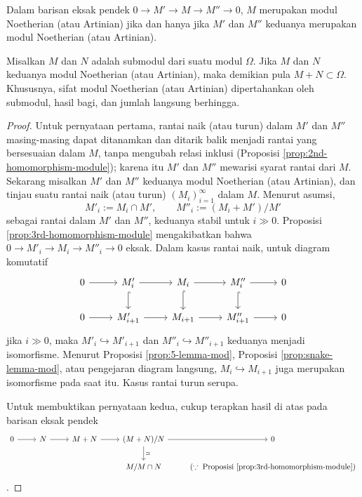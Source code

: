 \begin{lemma}\label{prop:noetherian-mod-ses}
	Dalam barisan eksak pendek $0 \to M' \to M \to M'' \to 0$, $M$ merupakan modul Noetherian (atau Artinian) jika dan hanya jika $M'$ dan $M''$ keduanya merupakan modul Noetherian (atau Artinian).
	
	Misalkan $M$ dan $N$ adalah submodul dari suatu modul $\Omega$. Jika $M$ dan $N$ keduanya modul Noetherian (atau Artinian), maka demikian pula $M + N \subset \Omega$. Khususnya, sifat modul Noetherian (atau Artinian) dipertahankan oleh submodul, hasil bagi, dan jumlah langsung berhingga.
\end{lemma}
\begin{proof}
	Untuk pernyataan pertama, rantai naik (atau turun) dalam $M'$ dan $M''$ masing-masing dapat ditanamkan dan ditarik balik menjadi rantai yang bersesuaian dalam $M$, tanpa mengubah relasi inklusi (Proposisi \ref{prop:2nd-homomorphism-module}); karena itu $M'$ dan $M''$ mewarisi syarat rantai dari $M$. Sekarang misalkan $M'$ dan $M''$ keduanya modul Noetherian (atau Artinian), dan tinjau suatu rantai naik (atau turun) $(M_i)_{i=1}^\infty$ dalam $M$. Menurut asumsi,
	\[ M'_i := M_i \cap M', \qquad M''_i := (M_i + M')/M' \]
	sebagai rantai dalam $M'$ dan $M''$, keduanya stabil untuk $i \gg 0$. Proposisi \ref{prop:3rd-homomorphism-module} mengakibatkan bahwa $0 \to M'_i \to M_i \to M''_i \to 0$ eksak. Dalam kasus rantai naik, untuk diagram komutatif
	\[\begin{tikzcd}
		0 \arrow[r] & M'_i \arrow[r] \arrow[hookrightarrow, d] & M_i \arrow[r] \arrow[hookrightarrow, d] & M''_i \arrow[hookrightarrow, d] \arrow[r] & 0 \\
		0 \arrow[r] & M'_{i+1} \arrow[r] & M_{i+1} \arrow[r] & M''_{i+1} \arrow[r] & 0
	\end{tikzcd}\]
	jika $i \gg 0$, maka $M'_i \hookrightarrow M'_{i+1}$ dan $M''_i \hookrightarrow M''_{i+1}$ keduanya menjadi isomorfisme. Menurut Proposisi \ref{prop:5-lemma-mod}, Proposisi \ref{prop:snake-lemma-mod}, atau pengejaran diagram langsung, $M_i \hookrightarrow M_{i+1}$ juga merupakan isomorfisme pada saat itu. Kasus rantai turun serupa.
	
	Untuk membuktikan pernyataan kedua, cukup terapkan hasil di atas pada barisan eksak pendek
	\[\begin{tikzcd}
		0 \arrow[r] & N \arrow[r] & M+N \arrow[r] & (M+N)/N \arrow[r] \arrow[d, "\simeq"] & 0 \\
		& & & M/M \cap N & (\because\;\text{Proposisi \ref{prop:3rd-homomorphism-module}})
	\end{tikzcd}\]
	.
\end{proof}

